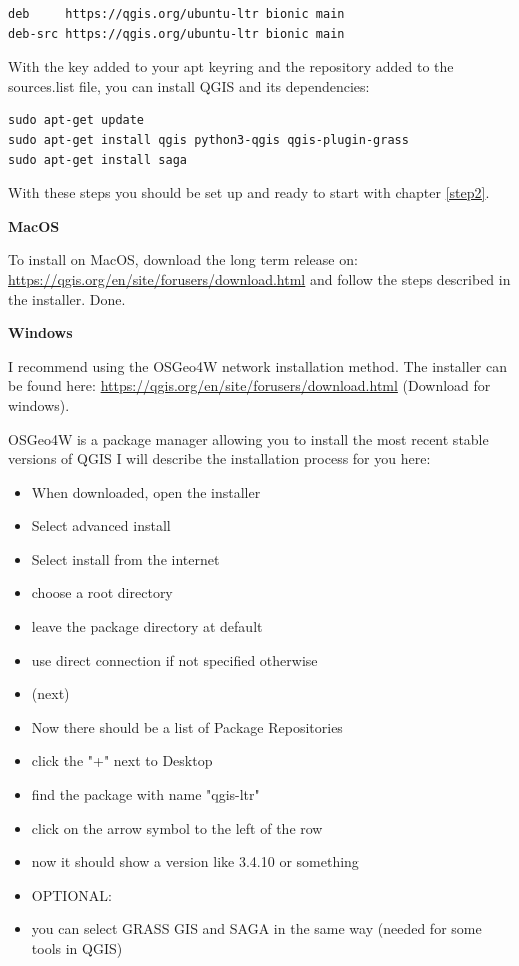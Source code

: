 \documentclass[12pt,a4paper]{scrartcl}
\begin{document}
\begin{verbatim}
deb     https://qgis.org/ubuntu-ltr bionic main
deb-src https://qgis.org/ubuntu-ltr bionic main
\end{verbatim}


With the key added to your apt keyring and the repository added to the sources.list file, you can install QGIS and its dependencies:  

\begin{verbatim}
sudo apt-get update
sudo apt-get install qgis python3-qgis qgis-plugin-grass
sudo apt-get install saga
\end{verbatim}

With these steps you should be set up and ready to start with chapter \ref{step2}. \newline

\textbf{MacOS} \newline

To install on MacOS, download the long term release on:
\url{https://qgis.org/en/site/forusers/download.html} and follow the steps described in the installer. Done.\newline

\textbf{Windows} \newline

I recommend using the OSGeo4W network installation method. \newline
The installer can be found here: \url{https://qgis.org/en/site/forusers/download.html} (Download for windows).

OSGeo4W is a package manager allowing you to install the most recent stable versions of QGIS
I will describe the installation process for you here: \newline

\begin{itemize}
	\item When downloaded, open the installer
	\item Select advanced install
	\item Select install from the internet
	\item choose a root directory 
	\item leave the package directory at default
	\item use direct connection if not specified otherwise
	\item (next)
	\item Now there should be a list of Package Repositories
	\item click the "+" next to Desktop
	\item find the package with name "qgis-ltr"
	\item click on the arrow symbol to the left of the row
	\item now it should show a version like 3.4.10 or something
	\item OPTIONAL: 
	\item you can select GRASS GIS and SAGA in the same way (needed for some tools in QGIS)
\end{itemize}
\end{document}

